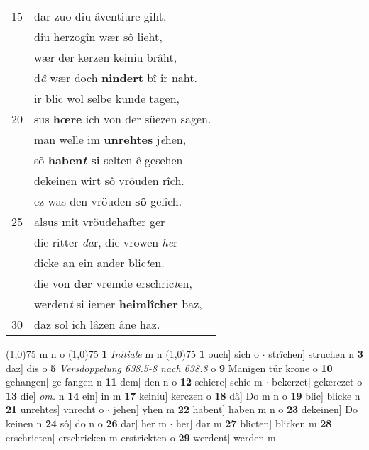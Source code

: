 \documentclass[8pt,a4paper,notitlepage]{article}
\begin{document}
\begin{table}[ht]
\begin{minipage}[t]{0.5\linewidth}
\begin{tabular}{rl}
15 & dar zuo diu âventiure giht,\\ 
 & diu herzogîn wær sô lieht,\\ 
 & wær der kerzen keiniu brâht,\\ 
 & d\textit{â} wær doch \textbf{nindert} bî ir naht.\\ 
 & ir blic wol selbe kunde tagen,\\ 
20 & sus \textbf{hœre} ich von der süezen sagen.\\ 
 & man welle im \textbf{unrehtes} j\textit{e}hen,\\ 
 & sô \textbf{haben\textit{t} si} selten ê gesehen\\ 
 & dekeinen wirt sô vröuden rîch.\\ 
 & ez was den vröuden \textbf{sô} gelîch.\\ 
25 & alsus mit vröudehafter ger\\ 
 & die ritter \textit{da}r, die vrowen \textit{he}r\\ 
 & dicke an ein ander blic\textit{t}en.\\ 
 & die von \textbf{der} vremde erschric\textit{t}en,\\ 
 & werden\textit{t} si iemer \textbf{heimlîcher} baz,\\ 
30 & daz sol ich lâzen âne haz.\\ 
\end{tabular}
\scriptsize
\line(1,0){75} \newline
m n o \newline
\line(1,0){75} \newline
\textbf{1} \textit{Initiale} m n  \newline
\line(1,0){75} \newline
\textbf{1} ouch] sich o  $\cdot$ strîchen] struchen n \textbf{3} daz] dis o \textbf{5} \textit{Versdoppelung 638.5-8 nach 638.8} o  \textbf{9} Manigen túr krone o \textbf{10} gehangen] ge fangen n \textbf{11} dem] den n o \textbf{12} schiere] schie m  $\cdot$ bekerzet] gekerczet o \textbf{13} die] \textit{om.} n \textbf{14} ein] in m \textbf{17} keiniu] kerczen o \textbf{18} dâ] Do m n o \textbf{19} blic] blicke n \textbf{21} unrehtes] vnrecht o  $\cdot$ jehen] yhen m \textbf{22} habent] haben m n o \textbf{23} dekeinen] Do keinen n \textbf{24} sô] do n o \textbf{26} dar] her m  $\cdot$ her] dar m \textbf{27} blicten] blicken m \textbf{28} erschricten] erschricken m erstrickten o \textbf{29} werdent] werden m \newline
\end{minipage}
\end{table}
\end{document}
